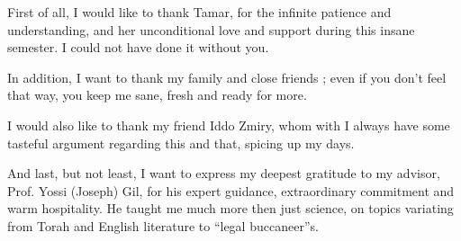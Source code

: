 First of all, I would like to thank Tamar, for the infinite patience and
understanding, and her unconditional love and support during this insane
semester.  I could not have done it without you.

In addition, I want to thank my family and close friends ; even if you don't
feel that way, you keep me sane, fresh and ready for more.

I would also like to thank my friend Iddo Zmiry, whom with I always have some
tasteful argument regarding this and that, spicing up my days.

And last, but not least, I want to express my deepest gratitude to my advisor,
Prof. Yossi (Joseph) Gil, for his expert guidance, extraordinary commitment and
warm hospitality.  He taught me much more then just science, on topics
variating from Torah and English literature to “legal buccaneer”s.
